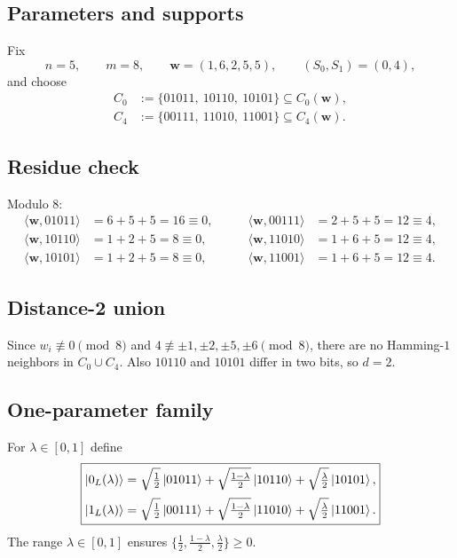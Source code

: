\documentclass[11pt]{article}
\begin{document}
\subsection{Parameters and supports}
Fix
\[
n=5,\qquad m=8,\qquad \mathbf w=(1,6,2,5,5),\qquad (S_0,S_1)=(0,4),
\]
and choose
\[
\begin{aligned}
C_0&:=\{01011,\ 10110,\ 10101\}\subseteq C_0(\mathbf w),\\
C_4&:=\{00111,\ 11010,\ 11001\}\subseteq C_4(\mathbf w).
\end{aligned}
\]

\subsection{Residue check}
Modulo $8$:
\[
\begin{aligned}
\langle \mathbf w,01011\rangle&=6+5+5=16\equiv 0,\\
\langle \mathbf w,10110\rangle&=1+2+5=8\equiv 0,\\
\langle \mathbf w,10101\rangle&=1+2+5=8\equiv 0,
\end{aligned}
\qquad
\begin{aligned}
\langle \mathbf w,00111\rangle&=2+5+5=12\equiv 4,\\
\langle \mathbf w,11010\rangle&=1+6+5=12\equiv 4,\\
\langle \mathbf w,11001\rangle&=1+6+5=12\equiv 4.
\end{aligned}
\]

\subsection{Distance-2 union}
Since $w_i\not\equiv 0\pmod 8$ and $4\not\equiv \pm 1,\pm 2,\pm 5,\pm 6\pmod 8$,
there are no Hamming-$1$ neighbors in $C_0\cup C_4$.
Also $10110$ and $10101$ differ in two bits, so $d=2$.

\subsection{One-parameter family}
For $\lambda\in[0,1]$ define
\[
\boxed{
\begin{aligned}
\ket{0_L(\lambda)}
&=
\sqrt{\tfrac12}\ket{01011}
+\sqrt{\tfrac{1-\lambda}{2}}\ket{10110}
+\sqrt{\tfrac{\lambda}{2}}\ket{10101},\\[2pt]
\ket{1_L(\lambda)}
&=
\sqrt{\tfrac12}\ket{00111}
+\sqrt{\tfrac{1-\lambda}{2}}\ket{11010}
+\sqrt{\tfrac{\lambda}{2}}\ket{11001}.
\end{aligned}}
\]
The range $\lambda\in[0,1]$ ensures $\{\tfrac12,\tfrac{1-\lambda}{2},\tfrac{\lambda}{2}\}\ge 0$.
\end{document}
